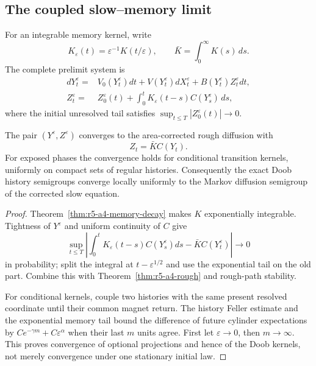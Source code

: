 \subsection{The coupled slow--memory limit}

For an integrable memory kernel, write
\[
 K_\varepsilon(t)=\varepsilon^{-1}K(t/\varepsilon),
 \qquad \bar K=\int_0^\infty K(s)\,ds.
\]
The complete prelimit system is
\[
 \begin{aligned}
 dY_t^\varepsilon={}&V_0(Y_t^\varepsilon)dt
 +V(Y_t^\varepsilon)dX_t^\varepsilon
 +B(Y_t^\varepsilon)Z_t^\varepsilon dt,\\
 Z_t^\varepsilon={}&Z_0^\varepsilon(t)
 +\int_0^tK_\varepsilon(t-s)C(Y_s^\varepsilon)\,ds,
 \end{aligned}
\]
where the initial unresolved tail satisfies
\(\sup_{t\le T}|Z_0^\varepsilon(t)|\to0\).

\begin{theorem}
\label{thm:r5-a4-short-memory}
The pair \((Y^\varepsilon,Z^\varepsilon)\) converges to the area-corrected
rough diffusion with
\[
 Z_t=\bar K C(Y_t).
\]
For exposed phases the convergence holds for conditional transition kernels,
uniformly on compact sets of regular histories.  Consequently the exact Doob
history semigroups converge locally uniformly to the Markov diffusion
semigroup of the corrected slow equation.
\end{theorem}

\begin{proof}
Theorem~\ref{thm:r5-a4-memory-decay} makes
\(K\) exponentially integrable.  Tightness of \(Y^\varepsilon\) and uniform
continuity of \(C\) give
\[
 \sup_{t\le T}\left|
  \int_0^tK_\varepsilon(t-s)C(Y_s^\varepsilon)ds
  -\bar K C(Y_t^\varepsilon)
 \right|\to0
\]
in probability; split the integral at \(t-\varepsilon^{1/2}\) and use the
exponential tail on the old part.  Combine this with
Theorem~\ref{thm:r5-a4-rough} and rough-path stability.

For conditional kernels, couple two histories with the same present resolved
coordinate until their common magnet return.  The history Feller estimate and
the exponential memory tail bound the difference of future cylinder
expectations by
\(Ce^{-\gamma m}+C\varepsilon^\alpha\) when their last \(m\) units agree.
First let \(\varepsilon\to0\), then \(m\to\infty\).  This proves convergence
of optional projections and hence of the Doob kernels, not merely convergence
under one stationary initial law.
\end{proof}

